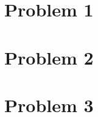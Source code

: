 \documentclass{article}
\begin{document}
\section*{Problem 1}



\section*{Problem 2}



\section*{Problem 3}
\end{document}
